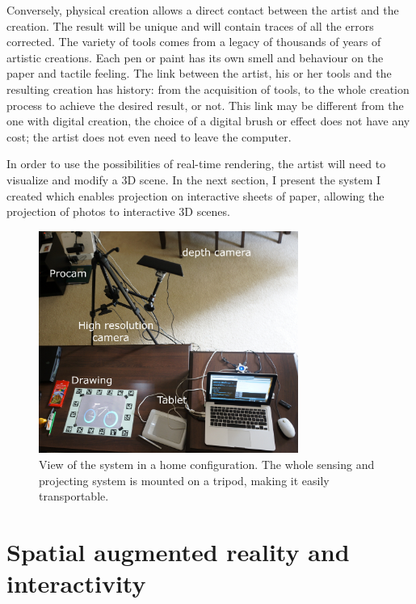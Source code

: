 \documentclass{article}
\begin{document}
Conversely, physical creation allows a direct contact between the artist and the creation. The result will be unique and will contain traces of all the errors corrected. The variety of tools comes from a legacy of thousands of years of artistic creations. Each pen or paint has its own smell and behaviour on the paper and tactile feeling. The link between the artist, his or her tools and the resulting creation has history: from the acquisition of tools, to the whole creation process to achieve the desired result, or not.
This link may be different from the one with digital creation, the choice of a digital brush or effect does not have any cost; the artist does not even need to leave the computer.




In order to use the possibilities of real-time rendering, the artist will need to visualize and modify a 3D scene. In the next section, I present the system I created which enables projection on interactive sheets of paper, allowing the projection of photos to interactive 3D scenes. 


\begin{figure}[!tb]
\includegraphics[width = 85mm]{DSC00299-2-rogne-annote.JPG}
\caption{View of the system in a home configuration. The whole sensing and projecting system is mounted on a tripod, making it easily transportable.} 
\label{fig:system}
\end{figure}


\section{Spatial augmented reality and interactivity}
\end{document}
